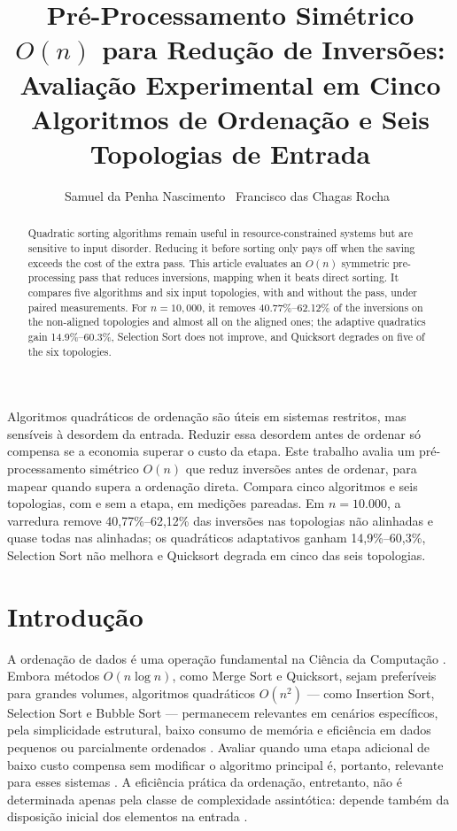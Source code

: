 \documentclass[12pt]{article}
\title{Pré-Processamento Simétrico $O(n)$ para Redução de 
Inversões: Avaliação Experimental em Cinco Algoritmos 
de Ordenação e Seis Topologias de Entrada}
\author{Samuel da Penha Nascimento~\inst{1}
Francisco das Chagas Rocha~\inst{1}}
\begin{document}
\maketitle

\begin{abstract}

Quadratic sorting algorithms remain useful in resource-constrained systems but are sensitive to input disorder. Reducing it before sorting only pays off when the saving exceeds the cost of the extra pass. This article evaluates an $O(n)$ symmetric pre-processing pass that reduces inversions, mapping when it beats direct sorting. It compares five algorithms and six input topologies, with and without the pass, under paired measurements. For $n=10{,}000$, it removes 40.77\%--62.12\% of the inversions on the non-aligned topologies and almost all on the aligned ones; the adaptive quadratics gain 14.9\%--60.3\%, Selection Sort does not improve, and Quicksort degrades on five of the six topologies.

\end{abstract}


\begin{resumo}

Algoritmos quadráticos de ordenação são úteis em sistemas restritos, mas sensíveis à desordem da entrada. Reduzir essa desordem antes de ordenar só compensa se a economia superar o custo da etapa. Este trabalho avalia um pré-processamento simétrico $O(n)$ que reduz inversões antes de ordenar, para mapear quando supera a ordenação direta. Compara cinco algoritmos e seis topologias, com e sem a etapa, em medições pareadas. Em $n=10.000$, a varredura remove 40,77\%--62,12\% das inversões nas topologias não alinhadas e quase todas nas alinhadas; os quadráticos adaptativos ganham 14,9\%--60,3\%, Selection Sort não melhora e Quicksort degrada em cinco das seis topologias.

\end{resumo}


\section{Introdução}

A ordenação de dados é uma operação fundamental na Ciência da Computação \cite{knuth_art_1973, sedgewick_algorithms_2011}. Embora métodos $O(n \log n)$, como Merge Sort e Quicksort, sejam preferíveis para grandes volumes, algoritmos quadráticos $O(n^2)$ --- como Insertion Sort, Selection Sort e Bubble Sort --- permanecem relevantes em cenários específicos, pela simplicidade estrutural, baixo consumo de memória e eficiência em dados pequenos ou parcialmente ordenados \cite{cormen_introduction_2022, ziviani_projeto_2021}. Avaliar quando uma etapa adicional de baixo custo compensa sem modificar o algoritmo principal é, portanto, relevante para esses sistemas \cite{estivill-castro_survey_1992, mannila_measures_1984}. A eficiência prática da ordenação, entretanto, não é determinada apenas pela classe de complexidade assintótica: depende também da disposição inicial dos elementos na entrada \cite{estivill-castro_survey_1992}.
\end{document}
